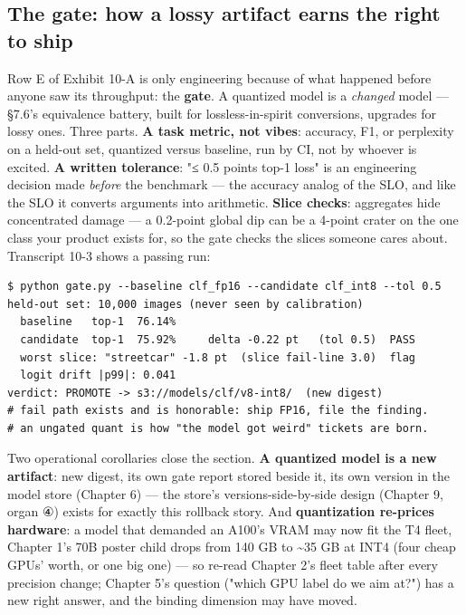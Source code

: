 \subsection*{The gate: how a lossy artifact earns the right to ship}

Row E of Exhibit 10-A is only engineering because of what happened before anyone saw its throughput: the \textbf{gate}. A quantized model is a \textit{changed} model — §7.6's equivalence battery, built for lossless-in-spirit conversions, upgrades for lossy ones. Three parts. \textbf{A task metric, not vibes}: accuracy, F1, or perplexity on a held-out set, quantized versus baseline, run by CI, not by whoever is excited. \textbf{A written tolerance}: "≤ 0.5 points top-1 loss" is an engineering decision made \textit{before} the benchmark — the accuracy analog of the SLO, and like the SLO it converts arguments into arithmetic. \textbf{Slice checks}: aggregates hide concentrated damage — a 0.2-point global dip can be a 4-point crater on the one class your product exists for, so the gate checks the slices someone cares about. Transcript 10-3 shows a passing run:

\begin{terminalbox}
\begin{Verbatim}[breaklines=true,breakanywhere=true,fontsize=\small,formatcom=\color{tbbtermfg},codes=\tbbcodeactive]
$ python gate.py --baseline clf_fp16 --candidate clf_int8 --tol 0.5
held-out set: 10,000 images (never seen by calibration)
  baseline   top-1  76.14%
  candidate  top-1  75.92%     delta -0.22 pt   (tol 0.5)  PASS
  worst slice: "streetcar" -1.8 pt  (slice fail-line 3.0)  flag
  logit drift |p99|: 0.041
verdict: PROMOTE -> s3://models/clf/v8-int8/  (new digest)
# fail path exists and is honorable: ship FP16, file the finding.
# an ungated quant is how "the model got weird" tickets are born.
\end{Verbatim}
\end{terminalbox}

Two operational corollaries close the section. \textbf{A quantized model is a new artifact}: new digest, its own gate report stored beside it, its own version in the model store (Chapter 6) — the store's versions-side-by-side design (Chapter 9, organ ④) exists for exactly this rollback story. And \textbf{quantization re-prices hardware}: a model that demanded an A100's VRAM may now fit the T4 fleet, Chapter 1's 70B poster child drops from 140 GB to \textasciitilde{}35 GB at INT4 (four cheap GPUs' worth, or one big one) — so re-read Chapter 2's fleet table after every precision change; Chapter 5's  question ("which GPU label do we aim at?") has a new right answer, and the binding dimension may have moved.

